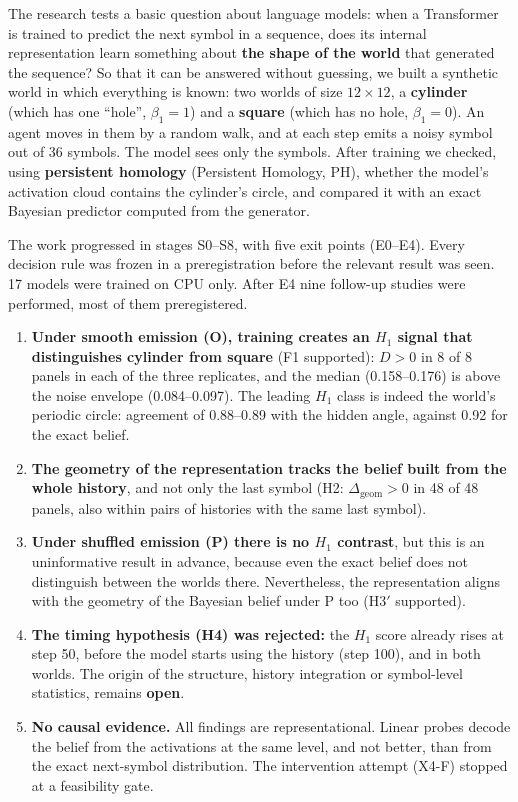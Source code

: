 \documentclass[12pt,a4paper]{article}
\newcommand{\en}[1]{\foreignlanguage{english}{#1}}   %
\newcommand{\dgeom}{\Delta_{\mathrm{geom}}}
\begin{document}
The research tests a basic question about language models: when a \en{Transformer} is trained to predict the next symbol in a sequence, does its internal representation learn something about \textbf{the shape of the world} that generated the sequence? So that it can be answered without guessing, we built a synthetic world in which everything is known: two worlds of size $12\times12$, a \textbf{cylinder} (which has one ``hole'', $\beta_1=1$) and a \textbf{square} (which has no hole, $\beta_1=0$). An agent moves in them by a random walk, and at each step emits a noisy symbol out of 36 symbols. The model sees only the symbols. After training we checked, using \textbf{persistent homology} (\en{Persistent Homology, PH}), whether the model's activation cloud contains the cylinder's circle, and compared it with an exact Bayesian predictor computed from the generator.

The work progressed in stages \en{S0--S8}, with five exit points (\en{E0--E4}). Every decision rule was frozen in a preregistration before the relevant result was seen. 17 models were trained on CPU only. After \en{E4} nine follow-up studies were performed, most of them preregistered.

\begin{keybox}
\begin{enumerate}[leftmargin=*]
\item \textbf{Under smooth emission (O), training creates an $H_1$ signal that distinguishes cylinder from square} (F1 supported): $D>0$ in 8 of 8 panels in each of the three replicates, and the median (0.158–0.176) is above the noise envelope (0.084–0.097). The leading $H_1$ class is indeed the world's periodic circle: agreement of 0.88–0.89 with the hidden angle, against 0.92 for the exact belief.
\item \textbf{The geometry of the representation tracks the belief built from the whole history}, and not only the last symbol (H2: $\dgeom>0$ in 48 of 48 panels, also within pairs of histories with the same last symbol).
\item \textbf{Under shuffled emission (P) there is no $H_1$ contrast}, but this is an uninformative result in advance, because even the exact belief does not distinguish between the worlds there. Nevertheless, the representation aligns with the geometry of the Bayesian belief under P too (H3$'$ supported).
\item \textbf{The timing hypothesis (H4) was rejected:} the $H_1$ score already rises at step 50, before the model starts using the history (step 100), and in both worlds. The origin of the structure, history integration or symbol-level statistics, remains \textbf{open}.
\item \textbf{No causal evidence.} All findings are representational. Linear \en{probes} decode the belief from the activations at the same level, and not better, than from the exact next-symbol distribution. The intervention attempt (\en{X4-F}) stopped at a feasibility gate.
\end{enumerate}
\end{keybox}
\end{document}
